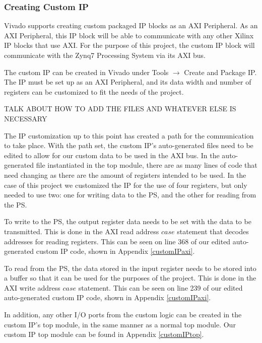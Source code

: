 \subsubsection{Creating Custom IP} \label{sssec:creatingCustomIP}
Vivado supports creating custom packaged IP blocks as an AXI Peripheral. As an AXI Peripheral, this IP block will be able to communicate with any other Xilinx IP blocks that use AXI. For the purpose of this project, the custom IP block will communicate with the Zynq7 Processing System via its AXI bus.
\par
The custom IP can be created in Vivado under Tools $\rightarrow$ Create and Package IP. The IP must be set up as an AXI Peripheral, and its data width and number of registers can be customized to fit the needs of the project.
\par
TALK ABOUT HOW TO ADD THE FILES AND WHATEVER ELSE IS NECESSARY
\par
The IP customization up to this point has created a path for the communication to take place. With the path set, the custom IP's auto-generated files need to be edited to allow for our custom data to be used in the AXI bus. In the auto-generated file instantiated in the top module, there are as many lines of code that need changing as there are the amount of registers intended to be used. In the case of this project we customized the IP for the use of four registers, but only needed to use two: one for writing data to the PS, and the other for reading from the PS.
\par
To write to the PS, the output register data needs to be set with the data to be transmitted. This is done in the AXI read address $case$ statement that decodes addresses for reading registers. This can be seen on line 368 of our edited auto-generated custom IP code, shown in Appendix \ref{customIPaxi}.
\par
To read from the PS, the data stored in the input register needs to be stored into a buffer so that it can be used for the purposes of the project. This is done in the AXI write address $case$ statement. This can be seen on line 239 of our edited auto-generated custom IP code, shown in Appendix \ref{customIPaxi}.
\par
In addition, any other I/O ports from the custom logic can be created in the custom IP's top module, in the same manner as a normal top module. Our custom IP top module can be found in Appendix \ref{customIPtop}.

